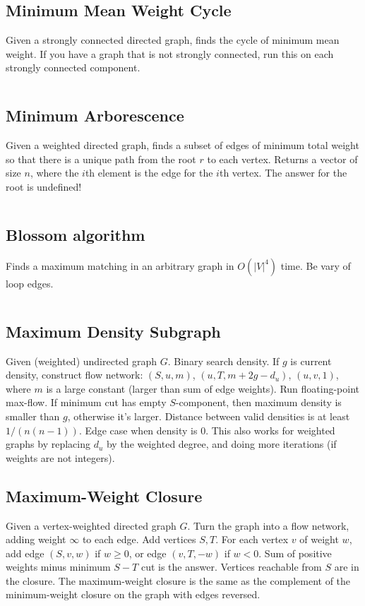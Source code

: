 \documentclass[8pt,a4paper,landscape,oneside]{amsart}
\newcommand{\code}[1]{\inputminted[fontsize=\normalsize,baselinestretch=1,breaklines,tabsize=2]{cpp}{code/#1}}
\begin{document}
\begin{multicols*}{3}
\subsection{Minimum Mean Weight Cycle}
Given a strongly connected directed graph, finds the cycle of minimum
mean weight. If you have a graph that is not strongly connected, run
this on each strongly connected component.
\code{graphs/min_mean_cycle.cpp}

\subsection{Minimum Arborescence}
Given a weighted directed graph, finds a subset of edges of minimum
total weight so that there is a unique path from the root $r$ to each
vertex. Returns a vector of size $n$, where the $i$th element is the
edge for the $i$th vertex. The answer for the root is undefined!
\code{graphs/arborescence.cpp}

\subsection{Blossom algorithm}
Finds a maximum matching in an arbitrary graph in $O(|V|^4)$ time. Be
vary of loop edges.
\code{graphs/blossom.cpp}

\subsection{Maximum Density Subgraph}
Given (weighted) undirected graph $G$. Binary search density. If $g$ is
current density, construct flow network: $(S, u, m)$, $(u, T,
m+2g-d_u)$, $(u,v,1)$, where $m$ is a large constant (larger than sum
of edge weights). Run floating-point max-flow. If minimum cut has empty
$S$-component, then maximum density is smaller than $g$, otherwise it's
larger. Distance between valid densities is at least $1/(n(n-1))$. Edge
case when density is $0$. This also works for weighted graphs by
replacing $d_u$ by the weighted degree, and doing more iterations (if
weights are not integers).

\subsection{Maximum-Weight Closure}
Given a vertex-weighted directed graph $G$. Turn the graph into a flow
network, adding weight $\infty$ to each edge. Add vertices $S,T$. For
each vertex $v$ of weight $w$, add edge $(S,v,w)$ if $w\geq 0$, or edge
$(v,T,-w)$ if $w<0$. Sum of positive weights minus minimum $S-T$ cut is
the answer. Vertices reachable from $S$ are in the closure. The
maximum-weight closure is the same as the complement of the
minimum-weight closure on the graph with edges reversed.


\end{multicols*}
\end{document}
